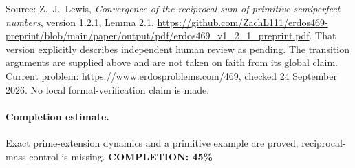 Source: Z.~J.~Lewis, \emph{Convergence of the reciprocal sum of primitive
semiperfect numbers}, version 1.2.1, Lemma 2.1,
\url{https://github.com/ZachL111/erdos469-preprint/blob/main/paper/output/pdf/erdos469_v1_2_1_preprint.pdf}.
That version explicitly describes independent human review as pending.
The transition arguments are supplied above and are not taken on
faith from its global claim.
Current problem: \url{https://www.erdosproblems.com/469},
checked 24 September 2026. No local formal-verification claim is made.

\paragraph{Completion estimate.}
Exact prime-extension dynamics and a primitive example are proved; reciprocal-mass control is missing.
\textbf{COMPLETION: 45\%}

